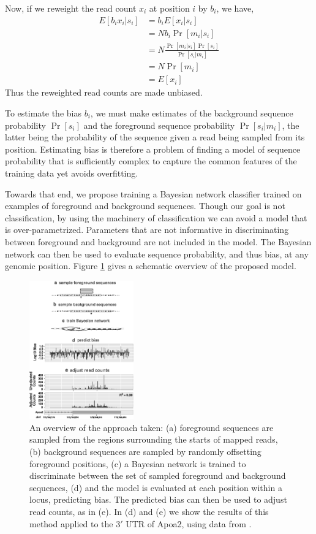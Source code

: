 \documentclass{bioinfo}
\begin{document}
Now, if we reweight the read count $x_i$ at position $i$ by $b_i$, we
have,
\begin{align*}
E[ b_i x_i | s_i ] &= b_i E[ x_i | s_i ] \\
&= N b_i \Pr[ m_i | s_i ] \\
&= N \frac{ \Pr[ m_i | s_i ] \Pr[ s_i ] }{ \Pr[ s_i | m_i ] } \\
&= N \Pr[ m_i ] \\
&= E[ x_i ]
\end{align*}
Thus the reweighted read counts are made unbiased.

To estimate the bias $b_i$, we must make estimates of the background sequence
probability $\Pr[s_i]$ and the foreground sequence probability $\Pr[ s_i | m_i
]$, the latter being the probability of the sequence given a read being sampled
from its position. Estimating bias is therefore a problem of finding a model of
sequence probability that is sufficiently complex to capture the common features
of the training data yet avoids overfitting.

Towards that end, we propose training a Bayesian network classifier trained on
examples of foreground and background sequences. Though our goal is not
classification, by using the machinery of classification we can avoid a model
that is over-parametrized. Parameters that are not informative in
discriminating between foreground and background are not included in the model.
The Bayesian network can then be used to evaluate sequence probability, and thus
bias, at any genomic position. Figure \ref{fig:overview} gives a schematic overview
of the proposed model.

\begin{figure}
\centerline{\includegraphics[width=0.4\textwidth]{overview.eps}}
\caption{An overview of the approach taken: (a) foreground sequences are sampled
from the regions surrounding the starts of mapped reads, (b) background
sequences are sampled by randomly offsetting foreground positions, (c) a
Bayesian network is trained to discriminate between the set of
sampled foreground and background sequences, (d) and the model is evaluated
at each position within a locus, predicting bias. The predicted bias can then be
used to adjust read counts, as in (e). In (d) and (e) we show the results of
this method applied to the $3'$ UTR of Apoa2, using data from
\citet{Mortazavi2008}.}
\label{fig:overview}
\end{figure}
\end{document}
